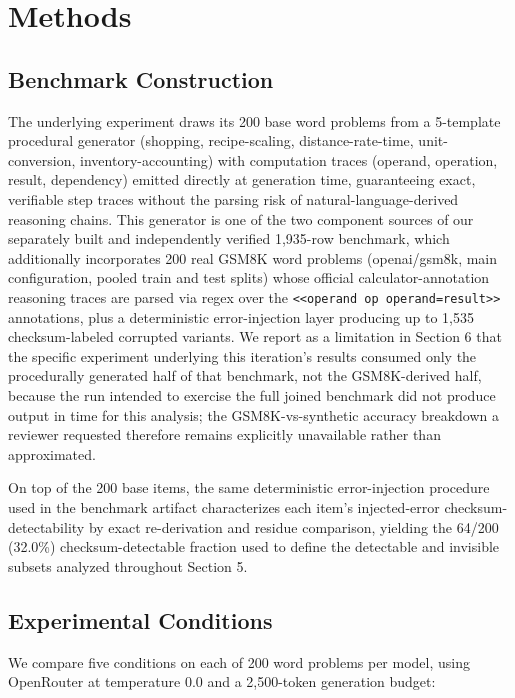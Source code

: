 \documentclass[11pt,letterpaper]{article}
\begin{document}
\section{Methods}

\subsection{Benchmark Construction}

The underlying experiment draws its 200 base word problems from a 5-template procedural generator (shopping, recipe-scaling, distance-rate-time, unit-conversion, inventory-accounting) with computation traces (operand, operation, result, dependency) emitted directly at generation time, guaranteeing exact, verifiable step traces without the parsing risk of natural-language-derived reasoning chains. This generator is one of the two component sources of our separately built and independently verified 1,935-row benchmark, which additionally incorporates 200 real GSM8K word problems (openai/gsm8k, main configuration, pooled train and test splits) whose official calculator-annotation reasoning traces are parsed via regex over the \texttt{<<operand op operand=result>>} annotations, plus a deterministic error-injection layer producing up to 1,535 checksum-labeled corrupted variants. We report as a limitation in Section 6 that the specific experiment underlying this iteration's results consumed only the procedurally generated half of that benchmark, not the GSM8K-derived half, because the run intended to exercise the full joined benchmark did not produce output in time for this analysis; the GSM8K-vs-synthetic accuracy breakdown a reviewer requested therefore remains explicitly unavailable rather than approximated.

On top of the 200 base items, the same deterministic error-injection procedure used in the benchmark artifact characterizes each item's injected-error checksum-detectability by exact re-derivation and residue comparison, yielding the 64/200 (32.0\%) checksum-detectable fraction used to define the detectable and invisible subsets analyzed throughout Section 5.

\subsection{Experimental Conditions}

We compare five conditions on each of 200 word problems per model, using OpenRouter at temperature 0.0 and a 2,500-token generation budget:
\end{document}
